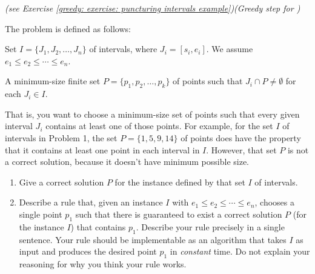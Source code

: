 \documentclass[11pt]{article}
\begin{document}
\lineacross


\setlength{\ITEMHT}{2in}
{

}

\newpage




\newpage
\problem \emph{(see Exercise \ref{greedy: exercise: puncturing intervals example})}\emph{(Greedy step for )} {\small

  The  problem is defined as follows: 

  \begin{mylist}
  \item[\bf input:] Set $I=\{J_1, J_2, \ldots, J_n\}$ of intervals, where $J_i = [s_i, e_i]$.
    We assume $e_1 \le e_2 \le \cdots \le e_n$.
  \item[\bf output:] A minimum-size finite set $P=\{p_1, p_2, \ldots, p_k\}$
    of points such that $J_i \cap P \ne \emptyset$ for each $J_i\in I$.
  \end{mylist}

  That is, you want to choose a minimum-size set of points
  such that every given interval $J_i$ contains at least one of those points.
  For example, for the set $I$ of intervals in Problem 1,
  the set $P=\{1, 5, 9, 14\}$ of points does have the property that
  it contains at least one point in each interval in $I$.
  However, that set $P$ is not a correct solution, because it doesn't have minimum possible size.

  \begin{enumerate}[label=(\alph*)]
  \item
    Give a correct solution $P$ for the %
    instance defined by that set $I$ of intervals.

  \item
    Describe a rule that, given an instance $I$ with $e_1 \le e_2\le \cdots \le e_n$,
    chooses a single point $p_1$ such that
    there is guaranteed to exist a correct solution $P$ (for the instance $I$) that contains $p_1$.
    Describe your rule precisely in a single sentence.
    Your rule should be implementable as an algorithm that takes $I$
    as input and produces the desired point $p_1$ in \emph{constant} time.
    Do not explain your reasoning for why you think your rule works.

  \end{enumerate}
}
\end{document}
